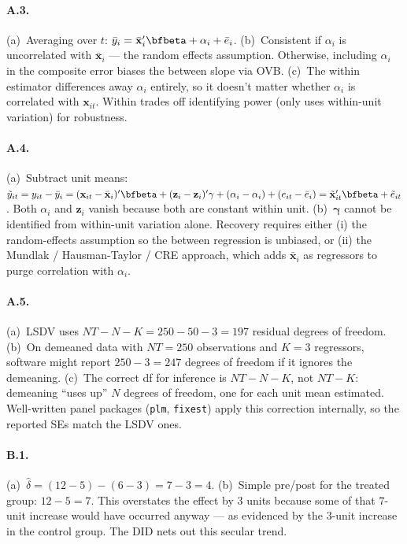 \documentclass{article}
\begin{document}
\paragraph{A.3.}  (a)~Averaging over $t$: $\bar y_i = \bar{\bm x}_i'\bfbeta + \alpha_i + \bar e_i$.  (b)~Consistent if $\alpha_i$ is uncorrelated with $\bar{\bm x}_i$ --- the random effects assumption.  Otherwise, including $\alpha_i$ in the composite error biases the between slope via OVB.  (c)~The within estimator differences away $\alpha_i$ entirely, so it doesn't matter whether $\alpha_i$ is correlated with $\bm x_{it}$.  Within trades off identifying power (only uses within-unit variation) for robustness.

\paragraph{A.4.}  (a)~Subtract unit means: $\tilde y_{it} = y_{it} - \bar y_i = (\bm x_{it} - \bar{\bm x}_i)'\bfbeta + (\bm z_i - \bm z_i)'\bm\gamma + (\alpha_i - \alpha_i) + (e_{it} - \bar e_i) = \tilde{\bm x}_{it}'\bfbeta + \tilde e_{it}$.  Both $\alpha_i$ and $\bm z_i$ vanish because both are constant within unit.  (b)~$\bm\gamma$ cannot be identified from within-unit variation alone.  Recovery requires either (i) the random-effects assumption so the between regression is unbiased, or (ii) the Mundlak / Hausman-Taylor / CRE approach, which adds $\bar{\bm x}_i$ as regressors to purge correlation with $\alpha_i$.

\paragraph{A.5.}  (a)~LSDV uses $NT - N - K = 250 - 50 - 3 = 197$ residual degrees of freedom.  (b)~On demeaned data with $NT = 250$ observations and $K = 3$ regressors, software might report $250 - 3 = 247$ degrees of freedom if it ignores the demeaning.  (c)~The correct df for inference is $NT - N - K$, not $NT - K$: demeaning ``uses up'' $N$ degrees of freedom, one for each unit mean estimated.  Well-written panel packages (\texttt{plm}, \texttt{fixest}) apply this correction internally, so the reported SEs match the LSDV ones.

\bigskip

\paragraph{B.1.}  (a)~$\hat\delta = (12 - 5) - (6 - 3) = 7 - 3 = 4$.  (b)~Simple pre/post for the treated group: $12 - 5 = 7$.  This overstates the effect by $3$ units because some of that $7$-unit increase would have occurred anyway --- as evidenced by the $3$-unit increase in the control group.  The DID nets out this secular trend.
\end{document}

